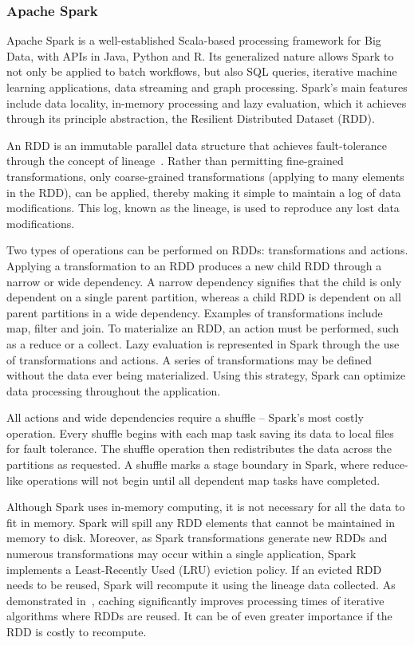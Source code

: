 \subsubsection{Apache Spark}

Apache Spark is a well-established Scala-based processing framework for Big Data, with
APIs in Java, Python and R. Its 
generalized nature allows Spark to not only be applied to batch workflows,
but also SQL queries, iterative machine learning applications, 
data streaming and graph processing. Spark's
main features include data locality, in-memory processing and lazy evaluation,
which it achieves through its principle abstraction, the Resilient Distributed 
Dataset (RDD). 

An RDD is an immutable parallel data structure that achieves fault-tolerance 
through the concept of lineage~\cite{zaharia2010spark}. Rather than permitting
fine-grained transformations, only coarse-grained transformations (applying to
many elements in the RDD), can be applied, thereby making it simple to maintain a 
log of data modifications. This log, known as the lineage, is used
to reproduce any lost data modifications.

Two types of operations can be performed on RDDs:
transformations and actions. Applying a transformation to an RDD produces a new
child RDD through a narrow or wide dependency. A narrow dependency signifies 
that the child is only dependent on a single parent partition, whereas a child 
RDD is dependent on all parent partitions in a wide dependency. Examples of 
transformations include map, filter and join. To materialize an RDD, an
action must be performed, such as a reduce or a collect. Lazy evaluation is 
represented in Spark through the use of transformations and actions. A series of
transformations may be defined without the data ever being materialized. Using 
this strategy, Spark can optimize data processing
throughout the application.

All actions and wide dependencies require a shuffle -- Spark's most costly
operation. Every shuffle begins with each map task saving its data to local
files for fault tolerance. The shuffle operation then 
redistributes the data across the partitions as requested. A shuffle marks a 
stage boundary in Spark, where reduce-like operations will not begin 
until all dependent map tasks have completed.

Although Spark uses in-memory computing, it is not necessary for all the data to
fit in memory. Spark will spill any RDD elements that cannot be maintained in memory to disk.
Moreover, as Spark transformations generate new RDDs and numerous 
transformations may occur within a single application, Spark implements a
Least-Recently Used (LRU) eviction
policy. If an evicted RDD needs to be reused, Spark will recompute it using the
lineage data collected. As demonstrated in~\cite{freeman2014mapping}, caching
significantly improves processing times of iterative algorithms where 
RDDs are reused. It can be of even greater importance if the RDD is costly to 
recompute.


